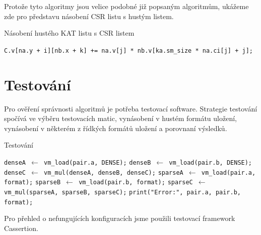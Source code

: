 Protože tyto algoritmy jsou velice podobné již popsaným algoritmům, ukážeme zde pro představu násobení CSR listu s hustým listem.

\begin{algorithm}[H]
	\caption{Násobení hustého KAT listu s CSR listem}\label{kat-mmm-den-csr}
	\begin{algorithmic}[1]
					\State \texttt{C.v[na.y + i][nb.x + k] += na.v[j] * nb.v[ka.sm\_size * na.ci[j] + j];}
				\EndFor
			\EndFor
		\EndFor
		\EndProcedure
	\end{algorithmic}
\end{algorithm}



\section{Testování}

Pro ověření správnosti algoritmů je potřeba testovací software. Strategie testování spočívá ve výběru testovacích matic, vynásobení v hustém formátu uložení, vynásobení v některém z řídkých formátů uložení a porovnaní výsledků.

\begin{algorithm}[H]
	\caption{Testování}\label{testing}
	\begin{algorithmic}[1]
				\State \texttt{denseA $\gets$ vm\_load(pair.a, DENSE);}
				\State \texttt{denseB $\gets$ vm\_load(pair.b, DENSE);}
				\State \texttt{denseC $\gets$ vm\_mul(denseA, denseB, denseC);}
				\State \texttt{sparseA $\gets$ vm\_load(pair.a, format);}
				\State \texttt{sparseB $\gets$ vm\_load(pair.b, format);}
				\State \texttt{sparseC $\gets$ vm\_mul(sparseA, sparseB, sparseC);}
					\State \texttt{print("Error:", pair.a, pair.b, format);}
				\EndIf
			\EndFor
		\EndFor
		\EndProcedure
	\end{algorithmic}
\end{algorithm}

Pro přehled o nefungujících konfiguracích jsme použili testovací framework Cassertion.

